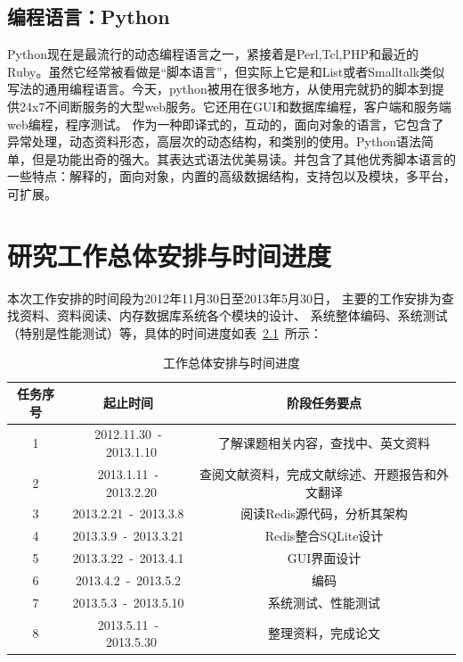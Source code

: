 \documentclass[proposal]{zjutreport}
\begin{document}
\section{编程语言：Python}
Python现在是最流行的动态编程语言之一，紧接着是Perl,Tcl,PHP和最近的Ruby。虽然它经常被看做是“脚本语言”，但实际上它是和List或者Smalltalk类似写法的通用编程语言。今天，python被用在很多地方，从使用完就扔的脚本到提供24x7不间断服务的大型web服务。它还用在GUI和数据库编程，客户端和服务端web编程，程序测试。
作为一种即译式的，互动的，面向对象的语言，它包含了异常处理，动态资料形态，高层次的动态结构，和类别的使用。Python语法简单，但是功能出奇的强大。其表达式语法优美易读。并包含了其他优秀脚本语言的一些特点：解释的，面向对象，内置的高级数据结构，支持包以及模块，多平台，可扩展。

\newpage

\chapter{研究工作总体安排与时间进度}
本次工作安排的时间段为2012年11月30日至2013年5月30日，
主要的工作安排为查找资料、资料阅读、内存数据库系统各个模块的设计、
系统整体编码、系统测试（特别是性能测试）等，具体的时间进度如表~\ref{tab:table1}~所示：

\begin{table}[htbp]
\caption{工作总体安排与时间进度}\label{tab:table1}
\vspace{0.5em}
\begin{center}
{\wuhao
\begin{tabular}{|c|c|c|}
\hline
任务序号 & 起止时间 & 阶段任务要点\\ \hline
1 & 2012.11.30~-~2013.1.10 & 了解课题相关内容，查找中、英文资料\\ \hline
2 & 2013.1.11~-~2013.2.20 & 查阅文献资料，完成文献综述、开题报告和外文翻译\\ \hline
3 & 2013.2.21~-~2013.3.8 & 阅读Redis源代码，分析其架构\\ \hline
4 & 2013.3.9~-~2013.3.21 & Redis整合SQLite设计\\ \hline
5 & 2013.3.22~-~2013.4.1 & GUI界面设计\\ \hline
6 & 2013.4.2~-~2013.5.2 & 编码\\ \hline
7 & 2013.5.3~-~2013.5.10 & 系统测试、性能测试\\ \hline
8 & 2013.5.11~-~2013.5.30 & 整理资料，完成论文\\ \hline
\end{tabular}}
\end{center}
\vspace{\baselineskip}
\end{table}

\backmatter
\endgroup %

\clearpage %

\nocite{*}                                   %

\end{document}
